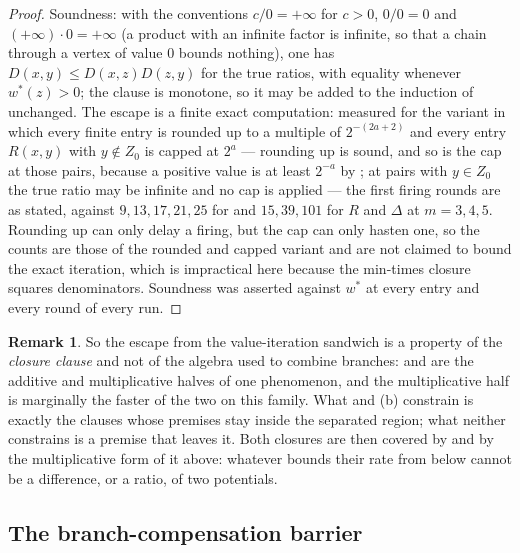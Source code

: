 \documentclass[11pt]{article}
\theoremstyle{plain}
\theoremstyle{definition}
\newtheorem{remark}[theorem]{Remark}
\begin{document}
\begin{proof}
Soundness: with the conventions $c/0=+\infty$ for $c>0$, $0/0=0$ and
$(+\infty)\cdot0=+\infty$ (a product with an infinite factor is
infinite, so that a chain through a vertex of value $0$ bounds nothing),
one has $D(x,y)\le D(x,z)D(z,y)$ for the true ratios, with equality
whenever $w^\ast(z)>0$; the clause is monotone, so it may be added to the
induction of  unchanged. The escape is a finite
exact computation: measured for the variant in which every finite entry
is rounded up to a multiple of $2^{-(2a+2)}$ and every entry $R(x,y)$
with $y\notin Z_0$ is capped at $2^{a}$ --- rounding up is sound, and so
is the cap at those pairs, because a positive value is at least $2^{-a}$
by ; at pairs with $y\in Z_0$ the true ratio
may be infinite and no cap is applied --- the first firing rounds are as
stated, against $9,13,17,21,25$ for  and
$15,39,101$ for $R$ and $\Delta$ at $m=3,4,5$. Rounding up can only
delay a firing, but the cap can only hasten one, so the counts are those
of the rounded and capped variant and are not claimed to bound the exact
iteration, which is impractical here because the min-times closure
squares denominators. Soundness was asserted against $w^\ast$ at every
entry and every round of every run.
\end{proof}

\begin{remark}\label{rem:ratio-closure}
So the escape from the value-iteration sandwich is a property of the
\emph{closure clause} and not of the algebra used to combine branches:
 and  are the additive and
multiplicative halves of one phenomenon, and the multiplicative half is
marginally the faster of the two on this family. What
 and (b) constrain is
exactly the clauses whose premises stay inside the separated region;
what neither constrains is a premise that leaves it. Both closures are
then covered by  and by the multiplicative form of
it above: whatever bounds their rate from below cannot be a difference,
or a ratio, of two potentials.
\end{remark}

\subsection{The branch-compensation barrier}\label{sec:matching-barrier}
\end{document}
